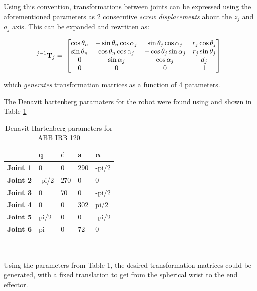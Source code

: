 \documentclass{UoNMCHA}
\numberwithin{equation}{section}
\begin{document}
Using this convention, transformations between joints can be expressed using the aforementioned parameters as 2 consecutive \textit{screw displacements} about the $z_j$ and $a_j$ axis. This can be expanded and rewritten as:

\begin{equation}
	\prescript{j-1}{}{\mathbf{T}}_{j} = \
	\begin{bmatrix}
		\cos{\theta_n} & -\sin{\theta_n} \cos{\alpha_j} & \sin{\theta_j} \cos{\alpha_j}  & r_j \cos{\theta_j} \\
		\sin{\theta_n} & \cos{\theta_n} \cos{\alpha_j}  & -\cos{\theta_j} \sin{\alpha_j} & r_j \sin{\theta_j} \\
		0           & \sin{\alpha_j}	 		  & \cos{\alpha_j}				& d_j\\
		0 			& 0						  & 0						& 1
	\end{bmatrix}
\end{equation}

which \textit{generates} transformation matrices as a function of 4 parameters. \

The Denavit hartenberg paramaters for the robot were found using \cite{RoboDKparams} and shown in Table \ref{tab:DHparamsABB}

\begin{table}[h]
	\centering
	\caption{Denavit Hartenberg parameters for ABB IRB 120}\label{tab:DHparamsABB}
	\begin{tabular}{l|llll}
		& \textbf{q} & \textbf{d} & \textbf{a} & $\mathbf{\alpha}$  \\ 
		\hline
		\textbf{Joint 1} & 0          & 0          & 290        & -pi/2           \\ 
		\hline
		\textbf{Joint 2} & -pi/2      & 270        & 0          & 0               \\ 
		\hline
		\textbf{Joint 3} & 0          & 70         & 0          & -pi/2           \\ 
		\hline
		\textbf{Joint 4} & 0          & 0          & 302        & pi/2            \\ 
		\hline
		\textbf{Joint 5} & pi/2       & 0          & 0          & -pi/2           \\ 
		\hline
		\textbf{Joint 6} & pi         & 0          & 72         & 0               \\
		\hline
	\end{tabular}
\end{table}\

Using the parameters from Table 1, the desired transformation matrices could be generated, 
with a fixed translation to get from the spherical wrist to the end effector.
\end{document}
